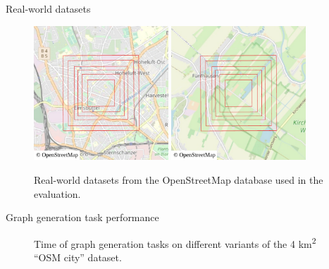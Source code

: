 \documentclass[xcolor={x11names}]{beamer}
\newenvironment{figcenter}
{%
	\parskip=0pt%
	\par%
	\nopagebreak%
	\centering%
}%
{%
	\par%
	\noindent%
	\ignorespacesafterend%
}
\begin{document}
		\begin{frame}{Real-world datasets}
			\begin{figure}
				\begin{figcenter}
					\includegraphics[width=0.45\textwidth]{images/qgis-overview-city.pdf}
					\hspace{0.5cm}
					\includegraphics[width=0.45\textwidth]{images/qgis-overview-rural.pdf}
				\end{figcenter}
				\caption{Real-world datasets from the OpenStreetMap database used in the evaluation.}
			\end{figure}
		\end{frame}
		
		\begin{frame}{Graph generation task performance}
			\begin{figure}
				\begin{figcenter}
					\hspace*{-0.35cm}
					\scalebox{0.7}
					{
						
					}
				\end{figcenter}
				\caption{Time of graph generation tasks on different variants of the 4 km\textsuperscript{2} \enquote{OSM city} dataset.}
			\end{figure}
		\end{frame}
		
\end{document}
